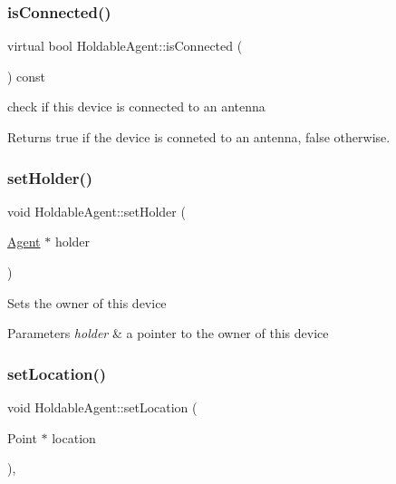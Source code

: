 \mbox{\label{class_holdable_agent_a1578388e51fefe7c19cd3b7c93a184eb}} 
\subsubsection{\texorpdfstring{isConnected()}{isConnected()}}
{\footnotesize\ttfamily virtual bool Holdable\+Agent\+::is\+Connected (\begin{DoxyParamCaption}{ }\end{DoxyParamCaption}) const\hspace{0.3cm}{\ttfamily [virtual]}}

check if this device is connected to an antenna \begin{DoxyReturn}{Returns}
true if the device is conneted to an antenna, false otherwise. 
\end{DoxyReturn}
\mbox{\label{class_holdable_agent_a39b53c9c6cacca716f38fccc520e9f52}} 
\subsubsection{\texorpdfstring{setHolder()}{setHolder()}}
{\footnotesize\ttfamily void Holdable\+Agent\+::set\+Holder (\begin{DoxyParamCaption}\item[{\mbox{\hyperlink{class_agent}{Agent}} $\ast$}]{holder }\end{DoxyParamCaption})}

Sets the owner of this device 
\begin{DoxyParams}{Parameters}
{\em holder} & a pointer to the owner of this device \\
\hline
\end{DoxyParams}
\mbox{\label{class_holdable_agent_aec98d2fe325b48d9a84ad3dad44700e0}} 
\subsubsection{\texorpdfstring{setLocation()}{setLocation()}}
{\footnotesize\ttfamily void Holdable\+Agent\+::set\+Location (\begin{DoxyParamCaption}\item[{Point $\ast$}]{location }\end{DoxyParamCaption})\hspace{0.3cm}{\ttfamily [override]}, {\ttfamily [virtual]}}

